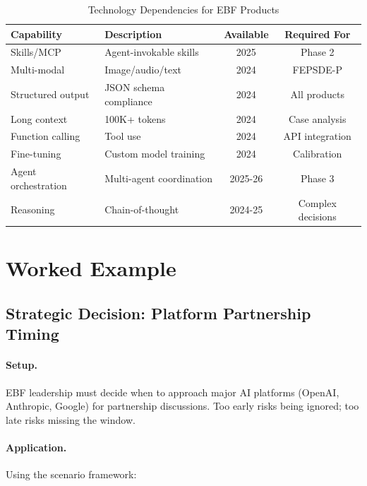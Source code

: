 \begin{table}[htbp]
\centering
\caption{Technology Dependencies for EBF Products}
\label{tab:vvv-tech-deps}
\renewcommand{\arraystretch}{1.3}
\begin{tabular}{@{}lp{5cm}cc@{}}
\toprule
\textbf{Capability} & \textbf{Description} & \textbf{Available} & \textbf{Required For} \\
\midrule
Skills/MCP & Agent-invokable skills & 2025 & Phase 2 \\
Multi-modal & Image/audio/text & 2024 & FEPSDE-P \\
Structured output & JSON schema compliance & 2024 & All products \\
Long context & 100K+ tokens & 2024 & Case analysis \\
Function calling & Tool use & 2024 & API integration \\
Fine-tuning & Custom model training & 2024 & Calibration \\
Agent orchestration & Multi-agent coordination & 2025-26 & Phase 3 \\
Reasoning & Chain-of-thought & 2024-25 & Complex decisions \\
\bottomrule
\end{tabular}
\end{table}


\section{Worked Example}
\label{sec:vvv1-example}

\subsection{Strategic Decision: Platform Partnership Timing}

\paragraph{Setup.}
EBF leadership must decide when to approach major AI platforms (OpenAI,
Anthropic, Google) for partnership discussions. Too early risks being
ignored; too late risks missing the window.

\paragraph{Application.}
Using the scenario framework:

